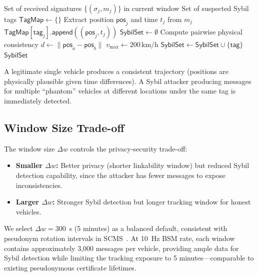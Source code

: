 \documentclass[conference,10pt]{IEEEtran}
\begin{document}
\begin{algorithm}[h]
\caption{Sybil Detection}
\label{alg:sybil}
\begin{algorithmic}[1]
\REQUIRE Set of received signatures $\{(\sigma_j, m_j)\}$ in current window
\ENSURE Set of suspected Sybil tags
\STATE $\mathsf{TagMap} \leftarrow \{\}$
    \STATE Extract position $\mathsf{pos}_j$ and time $t_j$ from $m_j$
    \STATE $\mathsf{TagMap}[\mathsf{tag}_j].\mathsf{append}((\mathsf{pos}_j, t_j))$
\ENDFOR
\STATE $\mathsf{SybilSet} \leftarrow \emptyset$
    \STATE Compute pairwise physical consistency
        \STATE $d \leftarrow \|\mathsf{pos}_a - \mathsf{pos}_b\|$
        \STATE $v_{\max} \leftarrow 200\,\text{km/h}$
            \STATE $\mathsf{SybilSet} \leftarrow \mathsf{SybilSet} \cup \{\mathsf{tag}\}$
        \ENDIF
    \ENDFOR
\ENDFOR
\RETURN $\mathsf{SybilSet}$
\end{algorithmic}
\end{algorithm}

A legitimate single vehicle produces a consistent trajectory (positions are physically plausible given time differences). A Sybil attacker producing messages for multiple ``phantom'' vehicles at different locations under the same tag is immediately detected.

\subsection{Window Size Trade-off}

The window size $\Delta w$ controls the privacy-security trade-off:

\begin{itemize}
    \item \textbf{Smaller $\Delta w$:} Better privacy (shorter linkability window) but reduced Sybil detection capability, since the attacker has fewer messages to expose inconsistencies.
    \item \textbf{Larger $\Delta w$:} Stronger Sybil detection but longer tracking window for honest vehicles.
\end{itemize}

We select $\Delta w = 300$~s (5 minutes) as a balanced default, consistent with pseudonym rotation intervals in SCMS~\cite{brecht2018}. At 10~Hz BSM rate, each window contains approximately 3{,}000 messages per vehicle, providing ample data for Sybil detection while limiting the tracking exposure to 5 minutes---comparable to existing pseudonymous certificate lifetimes.
\end{document}
